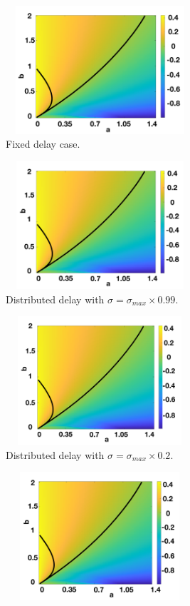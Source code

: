 \begin{figure}[H]
    \centering
    \begin{subfigure}[b]{0.45\textwidth}
        \centering
        \includegraphics[width=7cm,height=4.75cm]{t1f1.png}
        \caption{Fixed delay case.}
        \label{}
    \end{subfigure}
    \hfill
    \begin{subfigure}[b]{0.45\textwidth}
        \centering
        \includegraphics[width=7cm,height=4.75cm]{t1f2.png}
        \caption{Distributed delay with $\sigma=\sigma_{max}\times0.99$.}
        \label{}
    \end{subfigure}
    \hfill
    \begin{subfigure}[b]{0.45\textwidth}
        \centering
        \includegraphics[width=7cm,height=4.75cm]{t1f3.png}
        \caption{Distributed delay with $\sigma=\sigma_{max}\times0.2$.}
        \label{}
    \end{subfigure}
    \hfill
    \begin{subfigure}[b]{0.45\textwidth}
        \centering
        \includegraphics[width=7cm,height=4.75cm]{t1f4.png}

\end{subfigure}
\end{figure}
